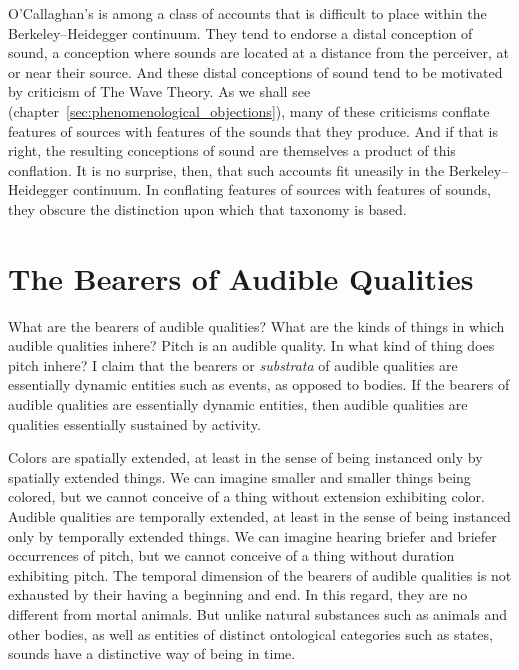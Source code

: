 O'Callaghan's is among a class of accounts that is difficult to place within the Berkeley--Heidegger continuum. They tend to endorse a distal conception of sound, a conception where sounds are located at a distance from the perceiver, at or near their source. And these distal conceptions of sound tend to be motivated by criticism of The Wave Theory. As we shall see (chapter~\ref{sec:phenomenological_objections}), many of these criticisms conflate features of sources with features of the sounds that they produce. And if that is right, the resulting conceptions of sound are themselves a product of this conflation. It is no surprise, then, that such accounts fit uneasily in the Berkeley--Heidegger continuum. In conflating features of sources with features of sounds, they obscure the distinction upon which that taxonomy is based. 



\section{The Bearers of Audible Qualities} %
\label{sec:the_emph_substrata}

What are the bearers of audible qualities? What are the kinds of things in which audible qualities inhere? Pitch is an audible quality. In what kind of thing does pitch inhere?  I claim that the bearers or \emph{substrata} of audible qualities are essentially dynamic entities such as events, as opposed to bodies. If the bearers of audible qualities are essentially dynamic entities, then audible qualities are qualities essentially sustained by activity.


Colors are spatially extended, at least in the sense of being instanced only by spatially extended things. We can imagine smaller and smaller things being colored, but we cannot conceive of a thing without extension exhibiting color. Audible qualities are temporally extended, at least in the sense of being instanced only by temporally extended things. We can imagine hearing briefer and briefer occurrences of pitch, but we cannot conceive of a thing without duration exhibiting pitch. The temporal dimension of the bearers of audible qualities is not exhausted by their having a beginning and end. In this regard, they are no different from mortal animals. But unlike natural substances such as animals and other bodies, as well as entities of distinct ontological categories such as states, sounds have a distinctive way of being in time.

